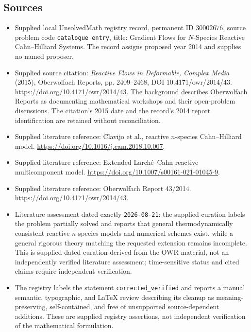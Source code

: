 \documentclass[11pt]{article}
\begin{document}
\subsection{Sources}
\begin{itemize}
\item Supplied local UnsolvedMath registry record, permanent ID \(30002676\), source problem code \texttt{catalogue entry}, title: Gradient Flows for \(N\)-Species Reactive Cahn--Hilliard Systems. The record assigns proposed year 2014 and supplies no named proposer.
\item Supplied source citation: \emph{Reactive Flows in Deformable, Complex Media} (2015), Oberwolfach Reports, pp. 2409--2468, DOI 10.4171/owr/2014/43. \url{https://doi.org/10.4171/owr/2014/43}. The background describes Oberwolfach Reports as documenting mathematical workshops and their open-problem discussions. The citation's 2015 date and the record's 2014 report identification are retained without reconciliation.
\item Supplied literature reference: Clavijo et al., reactive \(n\)-species Cahn--Hilliard model. \url{https://doi.org/10.1016/j.cam.2018.10.007}.
\item Supplied literature reference: Extended Larch\'{e}--Cahn reactive multicomponent model. \url{https://doi.org/10.1007/s00161-021-01045-9}.
\item Supplied literature reference: Oberwolfach Report 43/2014. \url{https://doi.org/10.4171/owr/2014/43}.
\item Literature assessment dated exactly \texttt{2026-08-21}: the supplied curation labels the problem partially solved and reports that general thermodynamically consistent reactive \(n\)-species models and numerical schemes exist, while a general rigorous theory matching the requested extension remains incomplete. This is supplied dated curation derived from the OWR material, not an independently verified literature assessment; time-sensitive status and cited claims require independent verification.
\item The registry labels the statement \texttt{corrected\_verified} and reports a manual semantic, typographic, and LaTeX review describing its cleanup as meaning-preserving, self-contained, and free of unsupported source-dependent additions. These are supplied registry assertions, not independent verification of the mathematical formulation.
\end{itemize}
\end{document}
